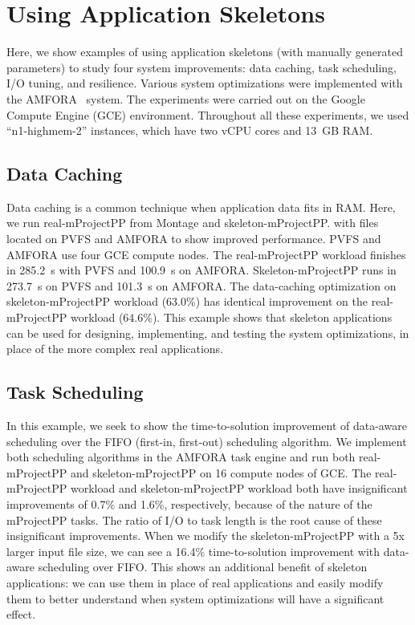 \documentclass[preprint,12pt]{elsarticle}
\newcommand{\zhaonote}[1]{{\textcolor{cyan}{ ***Zhao:  #1 }}}
\newcommand{\zhaonote}[1]{}
\begin{document}
\section{Using Application Skeletons}\label{lb:using}
Here, we show examples of using application skeletons (with manually generated parameters) to study four system improvements: data caching, task scheduling, I/O tuning, and resilience. 
Various system optimizations were implemented with the AMFORA~\cite{AMFS2013} system. 
The experiments were carried out on the Google Compute Engine (GCE) environment. 
Throughout all these experiments, we used ``n1-highmem-2'' instances, which have two vCPU cores and 13~GB RAM. 


\subsection{Data Caching}
Data caching is a common technique when application data fits in RAM. Here, we run real-mProjectPP from Montage and skeleton-mProjectPP.
with files located on PVFS and AMFORA to show improved performance. PVFS and AMFORA use four GCE compute nodes.
The real-mProjectPP workload finishes in 285.2~s with PVFS and 100.9~s on AMFORA.
Skeleton-mProjectPP runs in 273.7~s on PVFS and 101.3~s on AMFORA.
The data-caching optimization on skeleton-mProjectPP workload (63.0\%) has identical improvement on the real-mProjectPP workload (64.6\%). This example shows that skeleton applications can be used for designing, implementing, and testing the system optimizations, in place of the more complex real applications.


\subsection{Task Scheduling}
In this example, we seek to show the time-to-solution improvement of data-aware scheduling over the FIFO (first-in, first-out) scheduling algorithm.
We implement both scheduling algorithms in the AMFORA task engine and run both  real-mProjectPP  and skeleton-mProjectPP
on 16 compute nodes of GCE. The real-mProjectPP workload and skeleton-mProjectPP workload both have insignificant improvements of 0.7\% and 1.6\%, respectively, because of the nature of the mProjectPP tasks. 
The ratio of I/O to task length is the root cause of these insignificant improvements.
When we modify the skeleton-mProjectPP with a 5x larger input file size, we can see a 16.4\% time-to-solution improvement with data-aware scheduling over FIFO.  This shows an additional benefit of skeleton applications: we can use them in place of real applications and easily modify them to better understand when system optimizations will have a significant effect.
\end{document}
